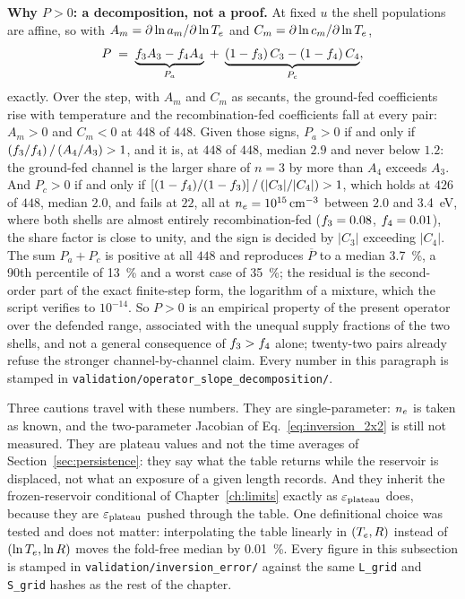\textbf{Why $P > 0$: a decomposition, not a proof.} At fixed $u$ the shell
populations are affine, so with $A_m = \partial\ln a_m/\partial\ln T_e$ and
$C_m = \partial\ln c_m/\partial\ln T_e$,
\begin{equation}
  P \;=\; \underbrace{f_{3}A_3 - f_{4}A_4}_{P_a}
        \;+\; \underbrace{(1-f_{3})\,C_3 - (1-f_{4})\,C_4}_{P_c},
  \label{eq:P_channels}
\end{equation}
exactly. Over the step, with $A_m$ and $C_m$ as secants, the ground-fed
coefficients rise with temperature and the recombination-fed coefficients fall
at every pair: $A_m > 0$ and $C_m < 0$ at $448$ of $448$. Given those signs,
$P_a > 0$ if and only if $(f_{3}/f_{4})\,/\,(A_4/A_3) > 1$, and it
is, at $448$ of $448$, median $2.9$ and never below $1.2$: the ground-fed
channel is the larger share of $n=3$ by more than $A_4$ exceeds $A_3$. And
$P_c > 0$ if and only if
$[(1-f_{4})/(1-f_{3})]\,/\,(|C_3|/|C_4|) > 1$, which holds at $426$
of $448$, median $2.0$, and fails at $22$, all at
$n_e = \SI{e15}{\per\cubic\centi\metre}$ between $2.0$ and
\SI{3.4}{\electronvolt}, where both shells are almost entirely
recombination-fed ($f_{3} = 0.08$, $f_{4} = 0.01$), the share factor
is close to unity, and the sign is decided by $|C_3|$ exceeding $|C_4|$. The
sum $P_a + P_c$ is positive at all $448$ and reproduces $\overline{P}$ to a
median \SI{3.7}{\percent}, a 90th percentile of \SI{13}{\percent} and a worst
case of \SI{35}{\percent}; the residual is the second-order part of the exact
finite-step form, the logarithm of a mixture, which the script verifies to
$10^{-14}$. So $P > 0$ is an empirical property of the present operator over
the defended range, associated with the unequal supply fractions of the two
shells, and not a general consequence of $f_{3} > f_{4}$ alone;
twenty-two pairs already refuse the stronger channel-by-channel claim. Every
number in this paragraph is stamped in
\texttt{validation/operator\_slope\_decomposition/}.

Three cautions travel with these numbers. They are single-parameter: $n_e$ is
taken as known, and the two-parameter Jacobian of Eq.~\eqref{eq:inversion_2x2}
is still not measured. They are plateau values and not the time averages of
Section~\ref{sec:persistence}: they say what the table returns while the
reservoir is displaced, not what an exposure of a given length records. And
they inherit the frozen-reservoir conditional of Chapter~\ref{ch:limits}
exactly as $\varepsilon_{\mathrm{plateau}}$ does, because they are $\varepsilon_{\mathrm{plateau}}$ pushed through the
table. One definitional choice was tested and does not matter: interpolating
the table linearly in $(T_e, R)$ instead of $(\ln T_e, \ln R)$ moves the
fold-free median by \SI{0.01}{\percent}. Every figure in this subsection is
stamped in \texttt{validation/inversion\_error/} against the same
\texttt{L\_grid} and \texttt{S\_grid} hashes as the rest of the chapter.

